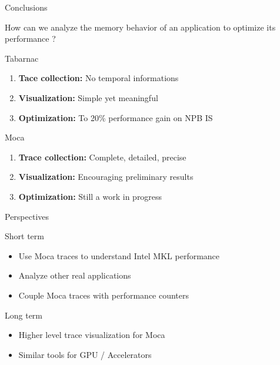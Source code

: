\documentclass[xcolor={usenames,dvipsnames},hyperref={pdfusetitle}]{beamer}
\begin{document}
\begin{frame}{Conclusions}
    \begin{exampleblock}{}
        How can we analyze the memory behavior of an application to optimize its performance ?
    \end{exampleblock}
    \pause
    \begin{block}{Tabarnac~\cite{Beniamine15TABARNAC}}
        \begin{enumerate}
            \item \textbf{Tace collection:} No temporal informations
            \item \textbf{Visualization:} Simple yet meaningful
            \item \textbf{Optimization:} To 20\% performance gain on NPB IS
        \end{enumerate}           
    \end{block}
    \pause
    \begin{exampleblock}{Moca~\cite{Beniamine15Memory,Beniamine16Moca}}
        \begin{enumerate}
            \item \textbf{Trace collection:} Complete, detailed, precise
            \item \textbf{Visualization:} Encouraging preliminary results
            \item \textbf{Optimization:} Still a work in progress
        \end{enumerate}          
    \end{exampleblock}
\end{frame}

\setcounter{finalframe}{\value{framenumber}}
\begin{frame}{Perspectives}
    \begin{block}{Short term}
        \begin{itemize}
            \item Use Moca traces to understand Intel MKL performance
            \item Analyze other real applications
            \item Couple Moca traces with performance counters
        \end{itemize}
    \end{block}
    \pause
    \begin{block}{Long term}
        \begin{itemize}
            \item Higher level trace visualization for Moca
            \item Similar tools for GPU / Accelerators
        \end{itemize}
    \end{block}
\end{frame}
\end{document}
